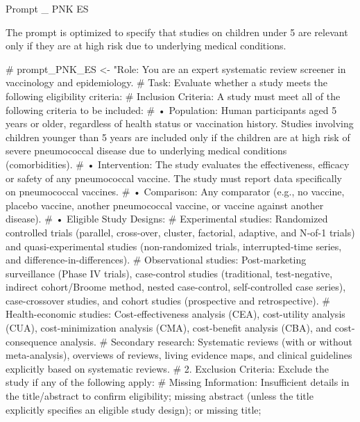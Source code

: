 \documentclass[
  letterpaper,
  DIV=11,
  numbers=noendperiod]{scrartcl}
\newenvironment{Shaded}{\begin{snugshade}}{\end{snugshade}}
\newcommand{\CommentTok}[1]{\textcolor[rgb]{0.37,0.37,0.37}{#1}}
\begin{document}
Prompt \_ PNK ES

The prompt is optimized to specify that studies on children under 5 are
relevant only if they are at high risk due to underlying medical
conditions.

\begin{Shaded}
\begin{Highlighting}[]
\CommentTok{\# prompt\_PNK\_ES \textless{}{-} "Role: You are an expert systematic review screener in vaccinology and epidemiology.}
\CommentTok{\# Task: Evaluate whether a study meets the following eligibility criteria:}
\CommentTok{\# Inclusion Criteria: A study must meet all of the following criteria to be included:}
\CommentTok{\# • Population: Human participants aged 5 years or older, regardless of health status or vaccination history. Studies involving children younger than 5 years are included only if the children are at high risk of severe pneumococcal disease due to underlying medical conditions (comorbidities). }
\CommentTok{\# • Intervention: The study evaluates the effectiveness, efficacy or safety of any pneumococcal vaccine. The study must report data specifically on pneumococcal vaccines. }
\CommentTok{\# • Comparison: Any comparator (e.g., no vaccine, placebo vaccine, another pneumococcal vaccine, or vaccine against another disease).}
\CommentTok{\# • Eligible Study Designs: }
\CommentTok{\# Experimental studies: Randomized controlled trials (parallel, cross{-}over, cluster, factorial, adaptive, and N{-}of{-}1 trials) and quasi{-}experimental studies (non{-}randomized trials, interrupted{-}time series, and difference{-}in{-}differences).}
\CommentTok{\# Observational studies: Post{-}marketing surveillance (Phase IV trials), case{-}control studies (traditional, test{-}negative, indirect cohort/Broome method, nested case{-}control, self{-}controlled case series), case{-}crossover studies, and cohort studies (prospective and retrospective).}
\CommentTok{\# Health{-}economic studies: Cost{-}effectiveness analysis (CEA), cost{-}utility analysis (CUA), cost{-}minimization analysis (CMA), cost{-}benefit analysis (CBA), and cost{-}consequence analysis.}
\CommentTok{\# Secondary research: Systematic reviews (with or without meta{-}analysis), overviews of reviews, living evidence maps, and clinical guidelines explicitly based on systematic reviews.}
\CommentTok{\# 2.    Exclusion Criteria: Exclude the study if any of the following apply: }
\CommentTok{\# Missing Information: Insufficient details in the title/abstract to confirm eligibility; missing abstract (unless the title explicitly specifies an eligible study design); or missing title; }

\end{Highlighting}
\end{Shaded}
\end{document}
